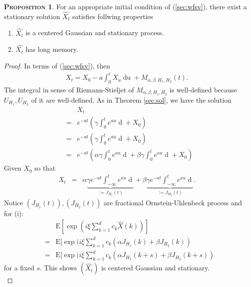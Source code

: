 \documentclass[a4paper, twoside, 11pt]{article}
\theoremstyle{definition}
\newtheorem{proposition}[definition]{\scshape Proposition}
\newcommand{\brkt}[1]{\left({#1} \right)}
\begin{document}
\begin{proposition}
  For an appropriate initial condition of (\ref{sec:wfsv}), there exist a stationary solution $\hat{X_t}$ satisfies follwing properties
\begin{enumerate}[topsep=0pt, itemsep=-1ex, partopsep=1ex, parsep=1ex, label=(\roman*)]
  \item $\hat{X_t}$ is a centered Gaussian and stationary process.
  \item $\hat{X_t}$ has long memory.
  \end{enumerate}
\end{proposition}
\begin{proof}
  In terms of (\ref{sec:wfsv}), then
  \begin{eqnarray*}
  X_t = X_0 - a\int_0^t X_u \mathop{du} + M_{\alpha,\beta,H_1,H_2}(t).
\end{eqnarray*}
The integral in sense of Riemann-Stieljet of $M_{\alpha,\beta,H_1,H_2}$ is well-defined because $U_{H_1}, U_{H_2}$ of it are well-defined.
As in Theorem \ref{sec:sol}, we have the solution
\begin{eqnarray*}
  &&X_t\\ 
  &=& e^{-at} \brkt{\gamma\int_0^t e^{au} \mathop{dM_{\alpha,\beta,H_1,H_2}} + X_0}\\
  &=&  e^{-at} \brkt{\gamma\int_0^t e^{au} \mathop{d(\alpha U_{H_1} + \beta U_{H_2})} + X_0}\\
  &=&  e^{-at} \brkt{\alpha \gamma\int_0^t e^{au} \mathop{d U_{H_1}} + \beta \gamma\int_0^t e^{au} \mathop{d U_{H_2}} + X_0}
\end{eqnarray*}
Given $X_0$ so that
\begin{eqnarray*}
  X_t &=&  \alpha \underbrace{\gamma e^{-at}\int_{-\infty}^t e^{au} \mathop{d U_{H_1}}}_{:=J_{H_1}(t)} + \beta\underbrace{ \gamma e^{-at}\int_{-\infty}^t e^{au} \mathop{d U_{H_2}}}_{:=J_{H_2}(t)}.
\end{eqnarray*}
Notice $(J_{H_1}(t)), (J_{H_2}(t))$ are fractional Ornstein-Uhlenbeck process and 
for (i): 
 \begin{eqnarray*}
   &&\mathrm{E}[\exp(i\xi\sum\limits_{k=1}^{d} c_k \hat{X}(k))]\\
   &=& \mathrm{E}[\exp(i\xi\sum\limits_{k=1}^{d} c_k (\alpha J_{H_1}(k) + \beta J_{H_2}(k))\\
	 &=& \mathrm{E}[\exp(i\xi\sum\limits_{k=1}^{d} c_k (\alpha J_{H_1}(k+s) + \beta J_{H_2}(k+s))
  \end{eqnarray*}
  for a fixed $s$. This shows $(\hat{X_t})$ is centered Gaussian and stationary.\\

\end{proof}
\end{document}
